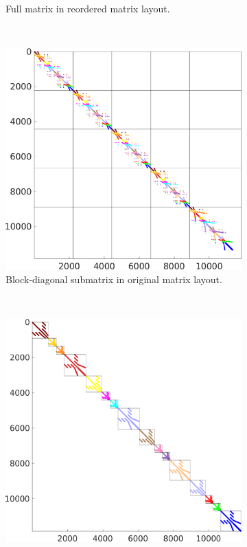 \begin{figure}
\begin{subfigure}[t]{0.49\textwidth}
    \caption{Full matrix in reordered matrix layout.}%
    \label{fig:16_reordered_matrix}%
  \end{subfigure}
  \\
  \begin{subfigure}[t]{0.49\textwidth}%
    \centering%
    \includegraphics[width=\textwidth]{images/implementation/16_original_diagonal_matrix.png}
    \caption{Block-diagonal submatrix in original matrix layout.}%
    \label{fig:16_original_diagonal_matrix}%
  \end{subfigure}
  \,
  \begin{subfigure}[t]{0.49\textwidth}%
    \centering%
    \includegraphics[width=\textwidth]{images/implementation/16_reordered_diagonal_matrix.png}

\end{subfigure}
\end{figure}
